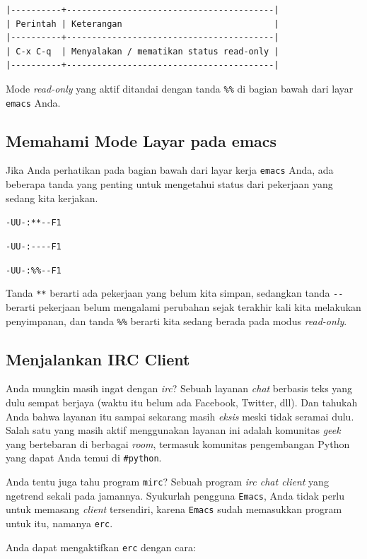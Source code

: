 \documentclass{article}
\begin{document}
\begin{verbatim}
|----------+-----------------------------------------|
| Perintah | Keterangan                              |
|----------+-----------------------------------------|
| C-x C-q  | Menyalakan / mematikan status read-only |
|----------+-----------------------------------------|
\end{verbatim}

Mode \emph{read-only} yang aktif ditandai dengan tanda \verb=%%= di bagian 
bawah dari layar \verb=emacs= Anda.

\subsection{Memahami Mode Layar pada emacs}

Jika Anda perhatikan pada bagian bawah dari layar kerja \verb=emacs= Anda,
ada beberapa tanda yang penting untuk mengetahui status dari pekerjaan 
yang sedang kita kerjakan.

\verb=-UU-:**--F1=

\verb=-UU-:----F1=

\verb=-UU-:%%--F1=

Tanda \verb=**= berarti ada pekerjaan yang belum kita simpan, sedangkan tanda
\verb=--= berarti pekerjaan belum mengalami perubahan sejak terakhir kali
kita melakukan penyimpanan, dan tanda \verb=%%= berarti kita sedang berada
pada modus \emph{read-only}.

\subsection{Menjalankan IRC Client}
Anda mungkin masih ingat dengan \emph{irc}? Sebuah layanan \emph{chat}
berbasis teks yang dulu sempat berjaya (waktu itu belum ada Facebook,
Twitter, dll). Dan tahukah Anda bahwa layanan itu sampai sekarang masih
\emph{eksis} meski tidak seramai dulu. Salah satu yang masih aktif
menggunakan layanan ini adalah komunitas \emph{geek} yang bertebaran
di berbagai \emph{room}, termasuk komunitas pengembangan Python yang
dapat Anda temui di \verb=#python=. 

Anda tentu juga tahu program \verb=mirc=? Sebuah program \emph{irc chat client}
yang ngetrend sekali pada jamannya. Syukurlah pengguna \verb=Emacs=, Anda 
tidak perlu untuk memasang \emph{client} tersendiri, karena \verb=Emacs= 
sudah memasukkan program untuk itu, namanya \verb=erc=.

Anda dapat mengaktifkan \verb=erc= dengan cara:
\end{document}
